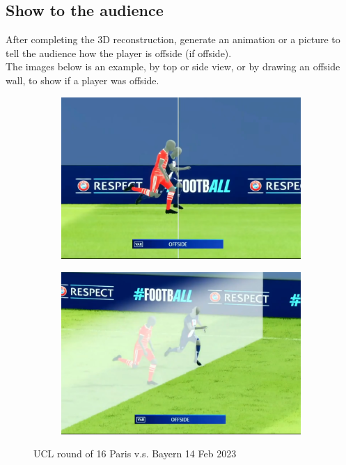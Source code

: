 \documentclass[12pt]{article}
\begin{document}
	\subsection{Show to the audience}
		After completing the 3D reconstruction, generate an animation or a picture to tell the audience how the player is offside (if offside).\\
		The images below is an example, by top or side view, or by drawing an offside wall, to show if a player was offside.
	\begin{figure}[ht!]
		\centering
		\begin{subfigure}[b]{0.4\textwidth}
			\includegraphics[width=\textwidth]{pic0.png}
		\end{subfigure}
		\begin{subfigure}[b]{0.4\textwidth}
			\includegraphics[width=\textwidth]{pic1.png}
		\end{subfigure}
	
		\caption{UCL round of 16 Paris v.s. Bayern 14 Feb 2023\cite{ucl}}
	\end{figure}
\end{document}
